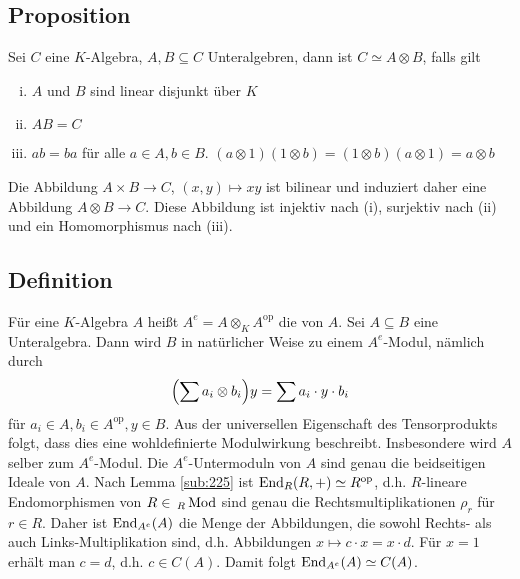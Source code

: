 \subsection[Proposition: Isomorphie einer $K$-Algebra zum Tensorprodukt von Unteralgebren]{Proposition} %
\label{sub:317}
Sei $C$ eine $K$-Algebra, $A,B \subseteq C$ Unteralgebren, dann ist $C \simeq A \otimes B$, falls gilt
\begin{enumerate}[(i)]
	\item $A$ und $B$ sind linear disjunkt über $K$
	\item $A B = C$
	\item $a b = b a$ für alle $a \in A, b \in B$. {\small \color{light_gray} $(a \otimes 1)(1 \otimes b)= (1 \otimes b)(a	\otimes 1)= a \otimes b$}
\end{enumerate}
Die Abbildung $A \times B \to C$, $(x,y) \mapsto xy$ ist bilinear und induziert daher eine Abbildung $A \otimes B \to C$. Diese Abbildung ist injektiv nach (i), surjektiv
nach (ii) und ein Homomorphismus nach (iii). \bewende

\subsection[Definition: Einhüllende Algebra]{Definition} %
\label{sub:318}
Für eine $K$-Algebra $A$ heißt $A^e = A \otimes_K A^\mathrm{op}$ die  von $A$. Sei $A \subseteq B$ eine Unteralgebra. Dann wird $B$ in 
natürlicher Weise zu einem $A^e$-Modul, nämlich durch 
\[
	\enbrace*{\sum a_i \otimes b_i} y = \sum a_i \cdot y \cdot b_i
\]
für $a_i \in A, b_i \in A^\mathrm{op}, y \in B$. Aus der universellen Eigenschaft des Tensorprodukts folgt, dass dies eine wohldefinierte Modulwirkung beschreibt. 
Insbesondere wird $A$ selber zum $A^e$-Modul. Die $A^e$-Untermoduln von $A$ sind genau die beidseitigen Ideale von $A$. Nach Lemma \ref{sub:225} ist 
$\operatorname{End}_R(R,+) \simeq R^\mathrm{op}$, d.h. $R$-lineare Endomorphismen von $R \in \,{_R\operatorname{Mod}}$ sind genau die Rechtsmultiplikationen $\rho_r$ für $r \in R$. Daher ist 
$\operatorname{End}_{A^e}(A)$ die Menge der Abbildungen, die sowohl Rechts- als auch Links-Multiplikation sind, d.h. Abbildungen $x \mapsto c \cdot x = x \cdot d$. Für $x=1$ erhält
man $c=d$, d.h. $c \in C(A)$. Damit folgt $\operatorname{End}_{A^e}(A) \simeq C(A)$.

